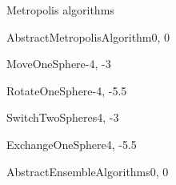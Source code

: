 \begin{scope}[shift={($(Material.north) + (0 cm, 80 cm)$)}]
    \begin{package}{Metropolis algorithms}
    
        \begin{scope}[local bounding box=Algorithm]
            \begin{abstractclass}[text width=\smallTextWidth]{AbstractMetropolisAlgorithm}{0, 0}
            \end{abstractclass}
            
            \def\operationsImplementation{
            \operation{try()}
        }
            \begin{class}[text width=\smallTextWidth]{MoveOneSphere}{-4, -3}
                \operationsImplementation{}
            \end{class}
            
            \begin{class}[text width=\smallTextWidth]{RotateOneSphere}{-4, -5.5}
                \operationsImplementation{}
            \end{class}
            
            \begin{class}[text width=\smallTextWidth]{SwitchTwoSpheres}{4, -3}
                \operationsImplementation{}
            \end{class}
            
            \begin{class}[text width=\smallTextWidth]{ExchangeOneSphere}{4, -5.5}
                \operationsImplementation{}
            \end{class}
        \end{scope}
        
        \begin{scope}[shift={($(Algorithm.north) + (-20 cm, 0 cm)$)}]
            \begin{abstractclass}[text width=\smallTextWidth]{AbstractEnsembleAlgorithms}{0, 0}
            \end{abstractclass}
            
            \def\operationsImplementation{
                \operation{chooseAlgorithm()}
            }
            

\end{scope}
\end{package}
\end{scope}
